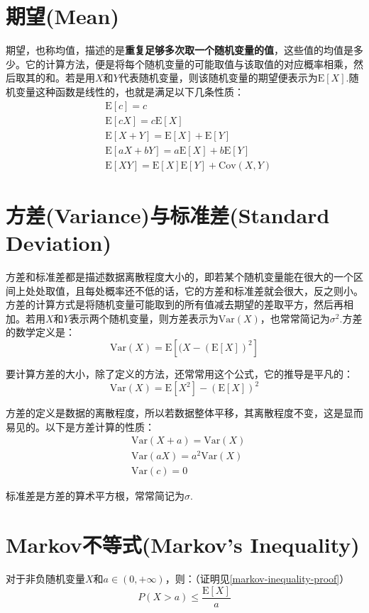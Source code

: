 \documentclass[UTF8]{ctexbook}
\begin{document}
\section{期望(Mean)}
期望，也称均值，描述的是\textbf{重复足够多次取一个随机变量的值}，这些值的均值是多少。它的计算方法，便是将每个随机变量的可能取值与该取值的对应概率相乘，然后取其的和。若是用$X$和$Y$代表随机变量，则该随机变量的期望便表示为$\mathrm E[X]$.随机变量这种函数是线性的，也就是满足以下几条性质：
\begin{align*}
        &\mathrm E[c]=c\\
        &\mathrm E[cX]=c\mathrm E[X]\\
        &\mathrm E[X+Y]=\mathrm E[X]+\mathrm E[Y]\\
        &\mathrm E[aX+bY]=a\mathrm E[X]+b\mathrm E[Y]\\
        &\mathrm E[XY]=\mathrm E[X]\mathrm E[Y]+\mathrm{Cov}(X,Y)
\end{align*}
\section{方差(Variance)与标准差(Standard Deviation)}
\label{var-sd}
方差和标准差都是描述数据离散程度大小的，即若某个随机变量能在很大的一个区间上处处取值，且每处概率还不低的话，它的方差和标准差就会很大，反之则小。方差的计算方式是将随机变量可能取到的所有值减去期望的差取平方，然后再相加。若用$X$和$Y$表示两个随机变量，则方差表示为$\mathrm{Var}(X)$，也常常简记为$\sigma^2$.方差的数学定义是：
\[
	\mathrm{Var}(X)=\mathrm E[(X-(\mathrm E[X])^2]
\]

要计算方差的大小，除了定义的方法，还常常用这个公式，它的推导是平凡的：
\[
    \mathrm{Var}(X)=\mathrm E[X^2]-\left(\mathrm{E}[X]\right)^2
\]

方差的定义是数据的离散程度，所以若数据整体平移，其离散程度不变，这是显而易见的。以下是方差计算的性质：
\begin{align*}
    &\mathrm{Var}(X+a)=\mathrm{Var}(X)\\
    &\mathrm{Var}(aX)=a^2\mathrm{Var}(X)\\
    &\mathrm{Var}(c)=0
\end{align*}

标准差是方差的算术平方根，常常简记为$\sigma$.
\section{Markov不等式(Markov's Inequality)}
\label{markov-inequality}
对于非负随机变量$X$和$a\in(0,+\infty)$，则：（证明见\ref{markov-inequality-proof}）
\[
	P(X>a)\leq\frac{\mathrm E[X]}{a}
\]
\end{document}
